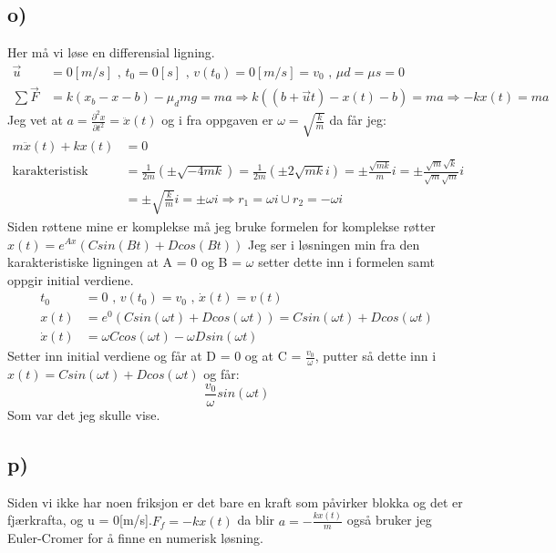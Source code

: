 \documentclass[a4paper,12pt,norsk]{article}
\begin{document}
\subsection*{o)}
Her må vi løse en differensial ligning.
\begin{align*}
\vec{u} &= 0[m/s]\textrm{ , } t_0 = 0[s] \textrm{ , } v(t_0)=0[m/s]=v_0 \textrm{ , } \mu{d} = \mu{s} = 0\\
\sum \vec{F} &= k(x_b-x-b) - \mu_d mg = ma \Rightarrow k((b+\vec{u}t) - x(t) - b) = ma \Rightarrow -kx(t) = ma
\end{align*}
Jeg vet at $a = \frac{\partial^2x}{\partial{t}^2} = \ddot{x}(t)$ og i fra oppgaven er $\omega = \sqrt{\frac{k}{m}}$ da får jeg:
\begin{align*}
m\ddot{x}(t) + kx(t) &= 0\\
\textrm{karakteristisk ligning} &= \frac{1}{2m}(\pm \sqrt{-4mk}) = \frac{1}{2m}(\pm 2\sqrt{mk}i) = \pm \frac{\sqrt{mk}}{m}i = \pm \frac{\sqrt{m}\sqrt{k}}{\sqrt{m}\sqrt{m}}i \\
 &= \pm \sqrt{\frac{k}{m}}i = \pm \omega i \Rightarrow r_1 = \omega i \cup r_2 = -\omega i
\end{align*}
Siden røttene mine er komplekse må jeg bruke formelen for komplekse røtter $x(t) = e^{Ax}(Csin(Bt) + Dcos(Bt))$ Jeg ser i løsningen min fra den karakteristiske ligningen at A = 0 og B = $\omega$ setter dette inn i formelen samt oppgir initial verdiene.
\begin{align*}
t_0 &= 0 \textrm{ , }  v(t_0) = v_0 \textrm{ , } \dot{x}(t) = v(t)\\
x(t) &= e^{0}(Csin(\omega t) + Dcos(\omega t)) = Csin(\omega t) + Dcos(\omega t)\\
\dot{x}(t) &= \omega Ccos(\omega t) - \omega Dsin(\omega t)
\end{align*}
Setter inn initial verdiene og får at D = 0 og at C = $\frac{v_0}{\omega}$, putter så dette inn i $x(t) = Csin(\omega t) + Dcos(\omega t)$ og får: $$\frac{v_0}{\omega}sin(\omega t)$$ Som var det jeg skulle vise.

\subsection*{p)}
Siden vi ikke har noen friksjon er det bare en kraft som påvirker blokka og det er fjærkrafta, og u = 0[m/s].$F_f = -kx(t)$ 
da blir $a = -\frac{kx(t)}{m}$ også bruker jeg Euler-Cromer for å finne en numerisk løsning. 

\end{document}
